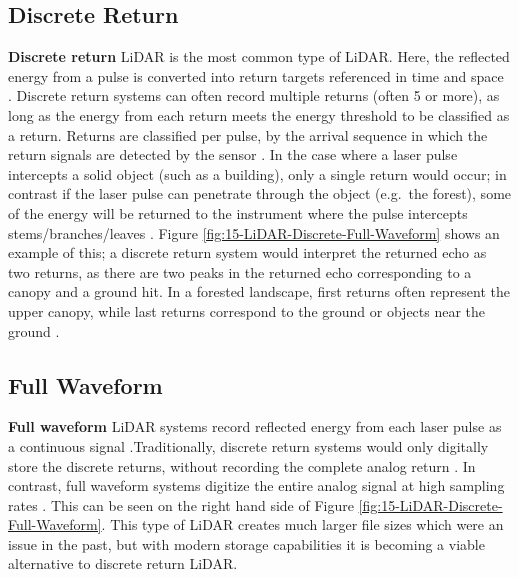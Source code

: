 \documentclass[
]{book}
\begin{document}
\subsection{Discrete Return}\label{discrete-return}

\textbf{Discrete return} LiDAR is the most common type of LiDAR. Here, the reflected energy from a pulse is converted into return targets referenced in time and space \citep{white_best_2013}. Discrete return systems can often record multiple returns (often 5 or more), as long as the energy from each return meets the energy threshold to be classified as a return. Returns are classified per pulse, by the arrival sequence in which the return signals are detected by the sensor \citep{uf_geomatics_-_fort_lauderdale_lidar_2016}. In the case where a laser pulse intercepts a solid object (such as a building), only a single return would occur; in contrast if the laser pulse can penetrate through the object (e.g.~the forest), some of the energy will be returned to the instrument where the pulse intercepts stems/branches/leaves \citep{white_best_2013}. Figure \ref{fig:15-LiDAR-Discrete-Full-Waveform} shows an example of this; a discrete return system would interpret the returned echo as two returns, as there are two peaks in the returned echo corresponding to a canopy and a ground hit. In a forested landscape, first returns often represent the upper canopy, while last returns correspond to the ground or objects near the ground \citep{white_best_2013}.

\subsection{Full Waveform}\label{full-waveform}

\textbf{Full waveform} LiDAR systems record reflected energy from each laser pulse as a continuous signal \citep{white_best_2013}.Traditionally, discrete return systems would only digitally store the discrete returns, without recording the complete analog return \citep{uf_geomatics_-_fort_lauderdale_lidar_2016}. In contrast, full waveform systems digitize the entire analog signal at high sampling rates \citep{uf_geomatics_-_fort_lauderdale_lidar_2016}. This can be seen on the right hand side of Figure \ref{fig:15-LiDAR-Discrete-Full-Waveform}. This type of LiDAR creates much larger file sizes which were an issue in the past, but with modern storage capabilities it is becoming a viable alternative to discrete return LiDAR.
\end{document}
